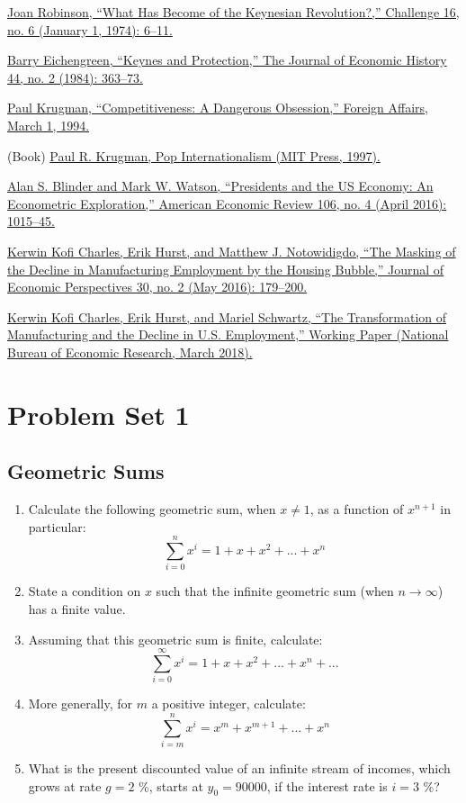 \documentclass[]{book}
\begin{document}
\href{bib/Robinson1974.pdf}{Joan Robinson, ``What Has Become of the
Keynesian Revolution?,'' Challenge 16, no. 6 (January 1, 1974): 6--11.}

\href{https://www.jstor.org/stable/2120714}{Barry Eichengreen, ``Keynes
and Protection,'' The Journal of Economic History 44, no. 2 (1984):
363--73.}

\href{https://www.jstor.org/stable/20045917}{Paul Krugman,
``Competitiveness: A Dangerous Obsession,'' Foreign Affairs, March 1,
1994.}

(Book) \href{https://mitpress.mit.edu/books/pop-internationalism}{Paul
R. Krugman, Pop Internationalism (MIT Press, 1997).}

\href{https://doi.org/10.1257/aer.20140913}{Alan S. Blinder and Mark W.
Watson, ``Presidents and the US Economy: An Econometric Exploration,''
American Economic Review 106, no. 4 (April 2016): 1015--45.}

\href{https://doi.org/10.1257/jep.30.2.179}{Kerwin Kofi Charles, Erik
Hurst, and Matthew J. Notowidigdo, ``The Masking of the Decline in
Manufacturing Employment by the Housing Bubble,'' Journal of Economic
Perspectives 30, no. 2 (May 2016): 179--200.}

\href{https://doi.org/10.3386/w24468}{Kerwin Kofi Charles, Erik Hurst,
and Mariel Schwartz, ``The Transformation of Manufacturing and the
Decline in U.S. Employment,'' Working Paper (National Bureau of Economic
Research, March 2018).}

\appendix


\chapter{Problem Set 1}\label{pset1}

\section{Geometric Sums}\label{geometric-sums}

\begin{enumerate}
\def\labelenumi{\arabic{enumi}.}
\item
  Calculate the following geometric sum, when \(x \neq 1\), as a
  function of \(x^{n+1}\) in particular:
  \[\sum_{i=0}^n x^i = 1+x+x^2+...+x^n\]
\item
  State a condition on \(x\) such that the infinite geometric sum (when
  \(n \to \infty\)) has a finite value.
\item
  Assuming that this geometric sum is finite, calculate:
  \[\sum_{i=0}^{\infty} x^i = 1+x+x^2+...+x^n+...\]
\item
  More generally, for \(m\) a positive integer, calculate:
  \[\sum_{i=m}^n x^i = x^m+x^{m+1}+...+x^n\]
\item
  What is the present discounted value of an infinite stream of incomes,
  which grows at rate \(g=2\) \%, starts at \(y_0=90000\), if the
  interest rate is \(i=3\) \%?
\end{enumerate}
\end{document}
